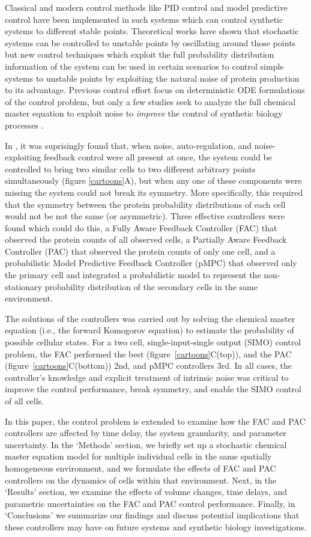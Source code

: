 \documentclass[12pt]{article}
\begin{document}
Classical and modern control methods like PID control and model predictive control have been implemented in such systems\cite{} which can control synthetic systems to different stable points. Theoretical works have shown that stochastic systems can be controlled to unstable points by oscillating around those points \cite{Guarino2020} but new control techniques which exploit the full probability distribution information of the system can be used in certain scenarios to control simple systems to unstable points by exploiting the natural noise of protein production to its advantage. Previous control effort focus on deterministic ODE formulations of the control problem, but only a few studies seek to analyze the full chemical master equation to exploit noise to {\em improve} the control of synthetic biology processes \cite{Szymanska2015,May2021}.  

In \cite{May2021}, it was suprisingly found that, when noise, auto-regulation, and noise-exploiting feedback control were all present at once, the system could be controlled to bring two similar cells to two different arbitrary points simultaneously (figure \ref{cartoons}A), but when any one of these components were missing the system could not break its symmetry. More specifically, this required that the symmetry between the protein probability distributions of each cell would not be not the same (or asymmetric). Three effective controllers were found which could do this, a Fully Aware Feedback Controller (FAC) that observed the protein counts of all observed cells, a Partially Aware Feedback Controller (PAC) that observed the protein counts of only one cell, and a probabilistic Model Predictive Feedback Controller (pMPC) that observed only the primary cell and integrated a probabilistic model to represent the non-stationary probability distribution of the secondary cells in the same environment. 

The solutions of the controllers was carried out by solving the chemical master equation (i.e., the forward Komogorov equation) to estimate the probability of possible cellular states. For a two cell, single-input-single output (SIMO) control problem, the FAC performed the best (figure\ \ref{cartoons}C(top)), and the PAC (figure\ \ref{cartoons}C(bottom)) 2nd, and pMPC controllers 3rd. In all cases, the controller's knowledge and explicit treatment of intrinsic noise was critical to improve the control performance, break symmetry, and enable the SIMO control of all cells.

In this paper, the control problem is extended to examine how the FAC and PAC controllers are affected by time delay, the system granularity, and parameter uncertainty. In the `Methods' section, we briefly set up a stochastic chemical master equation model for multiple individual cells in the same spatially homogeneous environment, and we formulate the effects of FAC and PAC controllers on the dynamics of cells within that environment. Next, in the `Results' section, we examine the effects of volume changes, time delays, and parametric uncertainties on the FAC and PAC control performance. Finally, in `Conclusions' we summarize our findings and discuss potential implications that these controllers may have on future systems and synthetic biology investigations.
\end{document}
